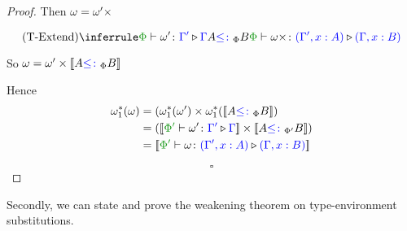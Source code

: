 \documentclass{Report}
\begin{document}
\begin{framed}
\begin{proof}
        \case{\textend}
        Then $\omega = \omega'\times$
        
        \begin{equation}
            \ntreeruleII{\textend}{\ewrel{\P}{\w'}{\G'}{\G}}{A\subtypep B}{\ewrel{\P}{\w\x}{(\G',x:A)}{(\G, x:B)}}
        \end{equation}
        
        So $\omega = \omega'\times{\bf [\![}A{\color{blue} \leq\colon}_\Phi B{\bf ]\!]}$
        
        Hence
        \begin{align*}
            \w_1\star(\w) &=(\w_1\star(\w')\times\w_1\star(\deno{A\subtypep B})\\
            & = (\deno{\ewrel{\P'}{\w'}{\G'}{\G}}\times\deno{A\subtypepp B})\\
            & = \deno{\ewrel{\P'}{\w}{(\G',x:A)}{(\G,x:B)}}
        \end{align*}
    
        $$\square$$
    \end{proof}
\end{framed}


Secondly, we can state and prove the weakening theorem on type-environment substitutions.
\end{document}
